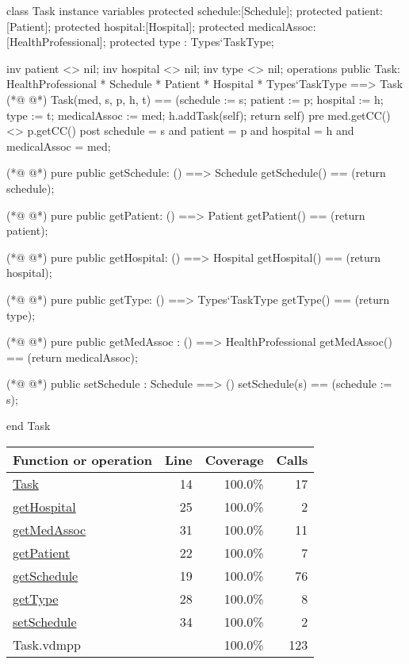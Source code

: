 \begin{vdmpp}[breaklines=true]
class Task
instance variables
  protected schedule:[Schedule];
  protected patient:[Patient];
  protected hospital:[Hospital];
  protected medicalAssoc:[HealthProfessional];
  protected type : Types`TaskType;
  
  inv patient <> nil;
  inv hospital <> nil;
  inv type <> nil;
operations
 public Task: HealthProfessional * Schedule * Patient * Hospital * Types`TaskType ==> Task
(*@
\label{Task:14}
@*)
  Task(med, s, p, h, t) == (schedule := s; patient := p; hospital := h; type := t; medicalAssoc := med; 
             h.addTask(self); return self)
 pre med.getCC() <> p.getCC()
 post schedule = s and patient = p and hospital = h and medicalAssoc = med;
 
(*@
\label{getSchedule:19}
@*)
 pure public getSchedule: () ==> Schedule
  getSchedule() == (return schedule);
  
(*@
\label{getPatient:22}
@*)
 pure public getPatient: () ==> Patient
  getPatient() == (return patient);
  
(*@
\label{getHospital:25}
@*)
 pure public getHospital: () ==> Hospital
  getHospital() == (return hospital);
  
(*@
\label{getType:28}
@*)
 pure public getType: () ==> Types`TaskType
  getType() == (return type);
  
(*@
\label{getMedAssoc:31}
@*)
 pure public getMedAssoc : () ==> HealthProfessional
  getMedAssoc() == (return medicalAssoc);
  
(*@
\label{setSchedule:34}
@*)
 public setSchedule : Schedule ==> ()
  setSchedule(s) == (schedule := s);

end Task
\end{vdmpp}
\bigskip
\begin{longtable}{|l|r|r|r|}
\hline
Function or operation & Line & Coverage & Calls \\
\hline
\hline
\hyperref[Task:14]{Task} & 14&100.0\% & 17 \\
\hline
\hyperref[getHospital:25]{getHospital} & 25&100.0\% & 2 \\
\hline
\hyperref[getMedAssoc:31]{getMedAssoc} & 31&100.0\% & 11 \\
\hline
\hyperref[getPatient:22]{getPatient} & 22&100.0\% & 7 \\
\hline
\hyperref[getSchedule:19]{getSchedule} & 19&100.0\% & 76 \\
\hline
\hyperref[getType:28]{getType} & 28&100.0\% & 8 \\
\hline
\hyperref[setSchedule:34]{setSchedule} & 34&100.0\% & 2 \\
\hline
\hline
Task.vdmpp & & 100.0\% & 123 \\
\hline
\end{longtable}

